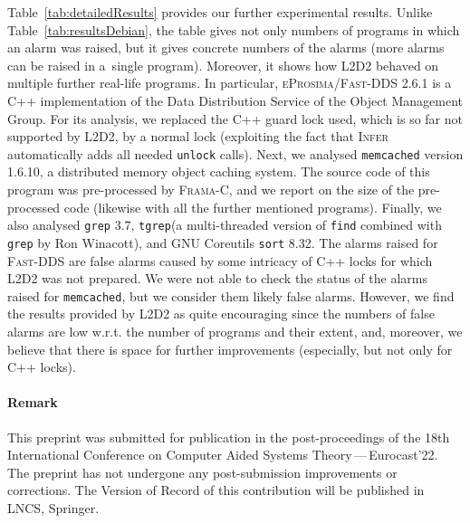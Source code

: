 \documentclass[runningheads]{llncs}
\newcommand{\LLDD}{\textsc{L2D2}\xspace} %
\newcommand{\Infer}{\textsc{Infer}\xspace}
\newcommand{\grep}{\texttt{grep}\xspace}
\newcommand{\sort}{\texttt{sort}\xspace}
\newcommand{\tgrep}{\texttt{tgrep}\xspace}
\newcommand{\find}{\texttt{find}\xspace}
\newcommand{\memcached}{\texttt{memcached}\xspace}
\newcommand{\DDS}{\textsc{Fast-DDS}\xspace}
\newcommand{\eprosimaDDS}{\textsc{eProsima/\DDS}\xspace}
\newcommand{\framac}{\textsc{Frama-C}\xspace}
\begin{document}
Table~\ref{tab:detailedResults} provides our further experimental results.
%
Unlike Table~\ref{tab:resultsDebian}, the table gives not only numbers of
programs in which an alarm was raised, but it gives concrete numbers of the
alarms (more alarms can be raised in a~single program).
%
Moreover, it shows how \LLDD behaved on multiple further real-life programs.
%
In particular, \eprosimaDDS 2.6.1 is a C++ implementation of the
Data Distribution Service of the Object Management Group.
%
For its analysis, we replaced the C++ guard lock used, which is so far not
supported by \LLDD, by a normal lock (exploiting the fact that \Infer
automatically adds all needed \texttt{unlock} calls).
%
Next, we analysed \memcached version 1.6.10, a distributed memory object caching
system.
%
The source code of this program was pre-processed by \framac \cite{frama-c},
and we report on the size of the pre-processed code (likewise with all the
further mentioned programs).
%
Finally, we also analysed \grep 3.7, \tgrep (a multi-threaded version of \find
combined with \grep by Ron Winacott), and GNU Coreutils \sort 8.32.
%
The alarms raised for \DDS are false alarms caused by some intricacy of C++
locks for which \LLDD was not prepared.
%
We were not able to check the status of the alarms raised for \memcached, but we
consider them likely false alarms.
%
However, we find the results provided by \LLDD as quite encouraging since the
numbers of false alarms are low w.r.t. the number of programs and their extent,
and, moreover, we believe that there is space for further improvements
(especially, but not only for C++ locks).

\enlargethispage{6mm}

\paragraph*{Remark} This preprint was submitted for publication in the
post-proceedings of the 18th International Conference on Computer Aided Systems
Theory\,---\,Eurocast'22.
%
The preprint has not undergone any post-submission improvements or corrections.
The Version of Record of this contribution will be published in LNCS, Springer.




\renewcommand\refname{References\vspace*{-2mm}}



\end{document}
